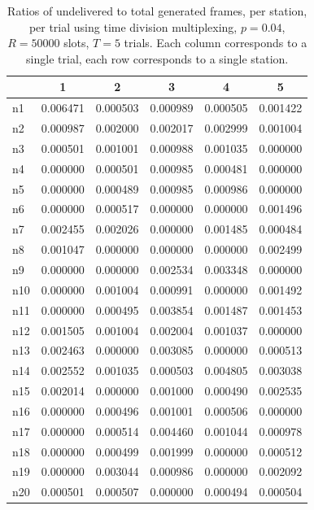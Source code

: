 \documentclass[twocolumn]{article}
\begin{document}
\begin{table}
    \centering 
    \label{fig:fairness_tdm}
    \begin{tabular}{l|c|c|c|c|c}
           & 1 & 2 & 3 & 4 & 5 \\
        \hline
        n1 & 0.006471 & 0.000503 & 0.000989 & 0.000505 & 0.001422 \\
        n2 & 0.000987 & 0.002000 & 0.002017 & 0.002999 & 0.001004 \\
        n3 & 0.000501 & 0.001001 & 0.000988 & 0.001035 & 0.000000 \\
        n4 & 0.000000 & 0.000501 & 0.000985 & 0.000481 & 0.000000 \\
        n5 & 0.000000 & 0.000489 & 0.000985 & 0.000986 & 0.000000 \\
        n6 & 0.000000 & 0.000517 & 0.000000 & 0.000000 & 0.001496 \\
        n7 & 0.002455 & 0.002026 & 0.000000 & 0.001485 & 0.000484 \\
        n8 & 0.001047 & 0.000000 & 0.000000 & 0.000000 & 0.002499 \\
        n9 & 0.000000 & 0.000000 & 0.002534 & 0.003348 & 0.000000 \\
       n10 & 0.000000 & 0.001004 & 0.000991 & 0.000000 & 0.001492 \\
       n11 & 0.000000 & 0.000495 & 0.003854 & 0.001487 & 0.001453 \\
       n12 & 0.001505 & 0.001004 & 0.002004 & 0.001037 & 0.000000 \\
       n13 & 0.002463 & 0.000000 & 0.003085 & 0.000000 & 0.000513 \\
       n14 & 0.002552 & 0.001035 & 0.000503 & 0.004805 & 0.003038 \\
       n15 & 0.002014 & 0.000000 & 0.001000 & 0.000490 & 0.002535 \\
       n16 & 0.000000 & 0.000496 & 0.001001 & 0.000506 & 0.000000 \\
       n17 & 0.000000 & 0.000514 & 0.004460 & 0.001044 & 0.000978 \\
       n18 & 0.000000 & 0.000499 & 0.001999 & 0.000000 & 0.000512 \\
       n19 & 0.000000 & 0.003044 & 0.000986 & 0.000000 & 0.002092 \\
       n20 & 0.000501 & 0.000507 & 0.000000 & 0.000494 & 0.000504

    \end{tabular}
    \caption{ Ratios of undelivered to total generated frames, per station, per trial using
        time division multiplexing, $p=0.04$, $R=50000$ slots, $T = 5$ trials.  
        Each column corresponds to a single trial, each row corresponds to a single station. }

\end{table}
\end{document}
